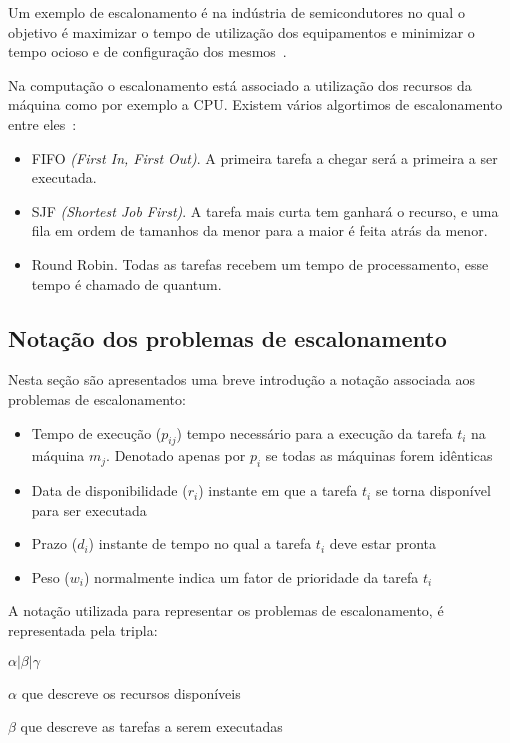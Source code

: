 Um exemplo de escalonamento é na indústria de semicondutores  no qual o objetivo é maximizar o tempo de utilização dos equipamentos e minimizar o tempo ocioso e de configuração dos mesmos~\cite{pinedo2012scheduling}.

Na computação o escalonamento está associado a utilização dos recursos da máquina como por exemplo a CPU. Existem vários algortimos de escalonamento entre eles~\cite{tanenbaum2006sistemas}:
\begin{itemize}
	\item FIFO \textit{(First In, First Out)}. A primeira tarefa a chegar será a primeira a ser executada.
	\item SJF \textit{(Shortest Job First)}. A tarefa mais curta tem ganhará o recurso, e uma fila em ordem de tamanhos da menor para a maior é feita atrás da menor.
	\item Round Robin. Todas as tarefas recebem um tempo de processamento, esse tempo é chamado de quantum.

\end{itemize}


\subsection{Notação dos problemas de escalonamento}

Nesta seção são apresentados uma breve introdução a notação associada aos problemas de escalonamento:

\begin{itemize}
\item Tempo de execução ($p_{ij}$) tempo necessário para a execução da tarefa $t_i$ na máquina $m_j$. Denotado apenas por $p_i$ se todas as máquinas forem idênticas
\item Data de disponibilidade ($r_i$) instante em que a tarefa $t_i$ se torna disponível para ser executada
\item Prazo ($d_i$) instante de tempo no qual a tarefa $t_i$ deve estar pronta
\item Peso ($w_i$) normalmente indica um fator de prioridade da tarefa $t_i$
\end{itemize}

A notação utilizada para representar os problemas de escalonamento, é representada pela tripla:   

$\alpha | \beta | \gamma$

$\alpha$ 	que descreve os recursos disponíveis

$\beta$ que descreve as tarefas a serem executadas

